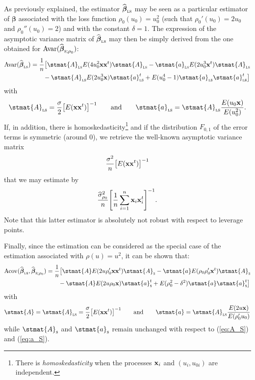 \begin{stremark}
As previously explained, the  estimator
$\sthat{\boldsymbol\beta}_\stsc{LS}$ may be seen as a particular 
estimator of $\boldsymbol{\beta}$ associated with the loss function
$\rho_0(u_0) = u_0^2$ (such that $\rho_0'(u_0) = 2 u_0$ and $\rho_0''(u_0) =
2$) and with the constant $\delta = 1$. The expression of the asymptotic
variance matrix of $\widehat{\boldsymbol\beta}_\stsc{LS}$ may then be simply
derived from the one obtained for
$\mathrm{Avar}(\sthat{\boldsymbol\beta}_{\stsc{S};\rho_0})$:
%
\begin{align}
    \label{eq:Avar_betahat_LS}
    \mathrm{Avar}(\sthat{\boldsymbol\beta}_\stsc{LS})
    & = \frac{1}{n} \big[ \stmat{A}_\stsc{LS} E(4 u_0^2\stvec{x}\stvec{x}^t) \stmat{A}_\stsc{LS}
        -\stmat{a}_\stsc{LS} E(2 u_0^3 \stvec{x}^t) \stmat{A}_\stsc{LS}
    \\\nonumber & \qquad 
        - \stmat{A}_\stsc{LS} E(2 u_0^3 \stvec{x}) \stmat{a}_\stsc{LS}^t
        + E(u_0^4 - 1) \stmat{a}_\stsc{LS}\stmat{a}_\stsc{LS}^t \big]
\end{align}
%
with
%
\begin{equation}\label{eq:A_a_LS}
    \stmat{A}_\stsc{LS} = \frac{\sigma}{2} \left[E(\stvec{x}\stvec{x}^t)\right]^{-1}
    \qquad\text{and}\qquad
    \stmat{a}_\stsc{LS} = \stmat{A}_\stsc{LS} \frac{E(u_0\stvec{x})}{E(u_0^2)}.
\end{equation}
%
If, in addition, there is homoskedasticity\footnote{There is
\emph{homoskedasticity} when the processes $\mathbf x_i$ and $(u_i, u_{0i})$
are independent.} and if the distribution $F_{0,1}$ of the error terms is
symmetric (around 0), we retrieve the well-known asymptotic variance matrix
\[
    \frac{\sigma^2}{n} \left[E(\stvec{x}\stvec{x}^t)\right]^{-1}
\]
that we may estimate by
\[
    \frac{\sthat{\sigma}_{\rho_0}^2}{n} 
    \left[\frac{1}{n} \sum_{i=1}^{n} \stvec{x}_i\stvec{x}_i^t\right]^{-1}.
\]
Note that this latter estimator is absolutely not robust with respect to
leverage points.

Finally, since the  estimation can be considered as the special case of the
 estimation associated with $\rho(u) = u^2$, it can be shown that:
%
\begin{align}
    \label{eq:Acov_betahat_LS_S}
    \mathrm{Acov}(\sthat{\boldsymbol\beta}_\stsc{LS},\widehat{\boldsymbol\beta}_{\stsc{S};\rho_0})
    & = \frac{1}{n} \big[ \stmat{A} E(2 u \rho_0'\stvec{x}\stvec{x}^t) \stmat{A}_\stsc{S}
        - \stmat{a} E(\rho_0\rho_0'\stvec{x}^t) \stmat{A}_\stsc{S}
    \\\nonumber & \qquad 
        - \stmat{A} E(2 u \rho_0\stvec{x}) \stmat{a}_\stsc{S}^t
        + E(\rho_0^2 - \delta^2) \stmat{a}\stmat{a}_\stsc{S}^t \big]
\end{align}
%
with%
\[
    \stmat{A} = \stmat{A}_\stsc{LS} = \frac{\sigma}{2}\left[E(\stvec{x}\stvec{x}^t)\right]^{-1}
    \qquad\text{and}\qquad
    \stmat{a} = \stmat{A}_\stsc{LS} \frac{E(2 u \stvec{x})}{E(\rho_0'u_0)}
\]
while $\stmat{A}_\stsc{S}$ and $\stmat{a}_\stsc{S}$ remain unchanged with
respect to (\ref{eq:A_S}) and (\ref{eq:a_S}).
\end{stremark}

